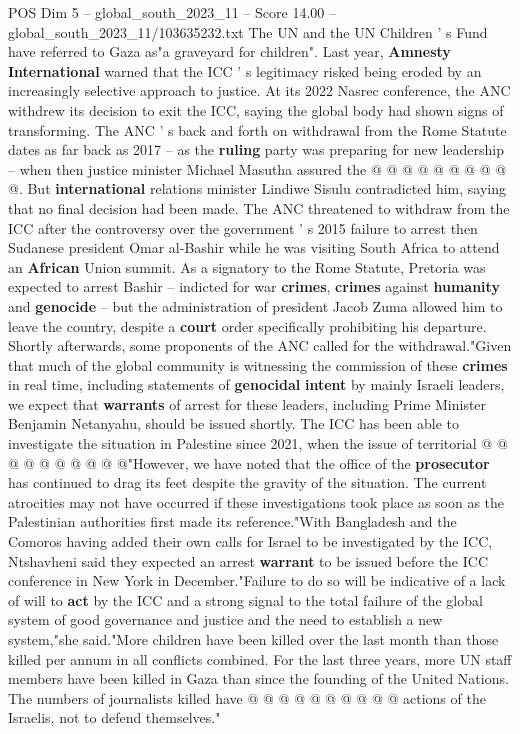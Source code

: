 \begin{textsample}{POS Dim 5 – global\_south\_2023\_11 – Score 14.00 – global\_south\_2023\_11/103635232.txt}
The UN and the UN Children ' s Fund have referred to Gaza as"a graveyard for children".
Last year, \textbf{Amnesty} \textbf{International} warned that the ICC ' s legitimacy risked being eroded by an increasingly selective approach to justice.
At its 2022 Nasrec conference, the ANC withdrew its decision to exit the ICC, saying the global body had shown signs of transforming.
The ANC ' s back and forth on withdrawal from the Rome Statute dates as far back as 2017 -- as the \textbf{ruling} party was preparing for new leadership -- when then justice minister Michael Masutha assured the @ @ @ @ @ @ @ @ @ @.
But \textbf{international} relations minister Lindiwe Sisulu contradicted him, saying that no final decision had been made.
The ANC threatened to withdraw from the ICC after the controversy over the government ' s 2015 failure to arrest then Sudanese president Omar al-Bashir while he was visiting South Africa to attend an \textbf{African} Union summit.
As a signatory to the Rome Statute, Pretoria was expected to arrest Bashir -- indicted for war \textbf{crimes}, \textbf{crimes} against \textbf{humanity} and \textbf{genocide} -- but the administration of president Jacob Zuma allowed him to leave the country, despite a \textbf{court} order specifically prohibiting his departure.
Shortly afterwards, some proponents of the ANC called for the withdrawal."Given that much of the global community is witnessing the commission of these \textbf{crimes} in real time, including statements of \textbf{genocidal} \textbf{intent} by mainly Israeli leaders, we expect that \textbf{warrants} of arrest for these leaders, including Prime Minister Benjamin Netanyahu, should be issued shortly.
The ICC has been able to investigate the situation in Palestine since 2021, when the issue of territorial @ @ @ @ @ @ @ @ @ @"However, we have noted that the office of the \textbf{prosecutor} has continued to drag its feet despite the gravity of the situation.
The current atrocities may not have occurred if these investigations took place as soon as the Palestinian authorities first made its reference."With Bangladesh and the Comoros having added their own calls for Israel to be investigated by the ICC, Ntshavheni said they expected an arrest \textbf{warrant} to be issued before the ICC conference in New York in December."Failure to do so will be indicative of a lack of will to \textbf{act} by the ICC and a strong signal to the total failure of the global system of good governance and justice and the need to establish a new system,"she said."More children have been killed over the last month than those killed per annum in all conflicts combined.
For the last three years, more UN staff members have been killed in Gaza than since the founding of the United Nations.
The numbers of journalists killed have @ @ @ @ @ @ @ @ @ @ actions of the Israelis, not to defend themselves."

\end{textsample}
